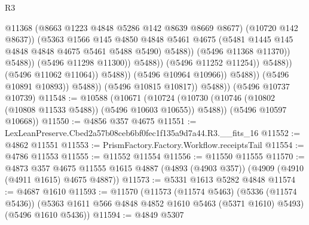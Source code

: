 \begin{lexlean}{R3}
\begin{coremodule}
                                                  @11368
                                                  (@8663 @1223 @4848 @5286 @142 @8639 @8669 @8677)
                                                  (@10720 @142 @8637))
                                                (@5363
                                                  @1566
                                                  @145
                                                  @4850
                                                  @4848
                                                  @5461
                                                  @4675
                                                  (@5481
                                                    @1445
                                                    @145
                                                    @4848
                                                    @4848
                                                    @4675
                                                    @5461
                                                    @5488
                                                    @5490)
                                                  @5488))
                                              (@5496 @11368 @11370))
                                            @5488))
                                        (@5496 @11298 @11300))
                                      @5488))
                                  (@5496 @11252 @11254))
                                @5488))
                            (@5496 @11062 @11064))
                          @5488))
                      (@5496 @10964 @10966))
                    @5488))
                (@5496 @10891 @10893))
              @5488))
          (@5496 @10815 @10817))
        @5488))
    (@5496 @10737 @10739)
@11548 := @10588
    (@10671
      (@10724 (@10730 (@10746 (@10802 (@10808 @11533 @5488)) (@5496 @10603 @10655)) @5488))
      (@5496 @10597 @10668))
@11550 := @4856 @357 @4675
@11551 := LexLeanPreserve.Cbed2a57b08ceb6bf0fec1f135a9d7a44.R3.__fits_16
@11552 := @4862 @11551
@11553 := PrismFactory.Factory.Workflow.receiptsTail
@11554 := @4786 @11553
@11555 := @11552 @11554
@11556 := @11550 @11555
@11570 := @4873
    @357
    @4675
    @11555
    @1615
    @4887
    (@4893 (@4903 @357))
    (@4909 (@4910 (@4911 @1615) @4675 @4887))
@11573 := @5331 @1613 @5282 @4848
@11574 := @4687 @1610
@11593 := @11570
    (@11573
      (@11574 @5463)
      (@5336 (@11574 @5436))
      (@5363 @1611 @566 @4848 @4852 @1610 @5463 (@5371 @1610) @5493)
      (@5496 @1610 @5436))
@11594 := @4849 @5307

\end{coremodule}
\end{lexlean}
